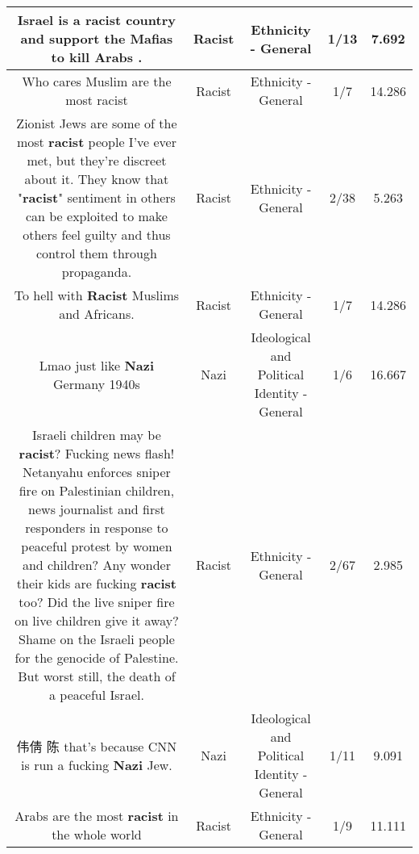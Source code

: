 \documentclass[11pt]{article}
\newlength\mylength
\begin{document}
\begin{center}
\begin{longtable}{|C{.65\mylength}|C{.30\mylength}|C{.12\mylength}|C{.12\mylength}|C{.12\mylength}|}
  \small Israel is a \textbf{racist} country and support the Mafias to kill Arabs .\normalsize   & Racist & Ethnicity - General & 1/13 & 7.692 \\  \hline
  \small Who cares Muslim are the most racist\normalsize   & Racist & Ethnicity - General & 1/7 & 14.286 \\  \hline
  \small Zionist Jews are some of the most \textbf{racist} people I've ever met, but they're discreet about it. They know that  "\textbf{racist}" sentiment in others can be exploited to make others feel guilty and thus control them through propaganda.\normalsize   & Racist & Ethnicity - General & 2/38 & 5.263 \\  \hline
  \small To hell with \textbf{Racist} Muslims and Africans.\normalsize   & Racist & Ethnicity - General & 1/7 & 14.286 \\  \hline
  \small Lmao just like \textbf{Nazi} Germany 1940s\normalsize   & Nazi &  Ideological and Political Identity - General & 1/6 & 16.667 \\  \hline
  \small Israeli children may be \textbf{racist}? Fucking news flash! Netanyahu enforces sniper fire on Palestinian children, news journalist and first responders in response to peaceful protest by women and children? Any wonder their kids are fucking \textbf{racist} too? Did the live sniper fire on live children give it away? Shame on the Israeli people for the genocide of Palestine. But worst still, the death of a peaceful Israel.\normalsize   & Racist & Ethnicity - General & 2/67 & 2.985 \\  \hline
  \small 伟倩 陈 that's because CNN is run a fucking \textbf{Nazi} Jew.\normalsize   & Nazi &  Ideological and Political Identity - General & 1/11 & 9.091 \\  \hline
  \small Arabs are the most \textbf{racist} in the whole world\normalsize   & Racist & Ethnicity - General & 1/9 & 11.111 \\  \hline

\end{longtable}
\end{center}
\end{document}
